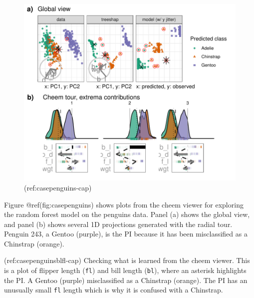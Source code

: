 \documentclass[
]{article}
\begin{document}
\begin{figure}

{\centering \includegraphics[width=1\linewidth]{./figures/case_penguins} 

}

\caption{(ref:casepenguins-cap)}\label{fig:casepenguins}
\end{figure}

Figure @ref(fig:casepenguins) shows plots from the cheem viewer for
exploring the random forest model on the penguins data. Panel (a) shows
the global view, and panel (b) shows several 1D projections generated
with the radial tour. Penguin 243, a Gentoo (purple), is the PI because
it has been misclassified as a Chinstrap (orange).

(ref:casepenguinsblfl-cap) Checking what is learned from the cheem
viewer. This is a plot of flipper length (\texttt{fl}) and bill length
(\texttt{bl}), where an asterisk highlights the PI. A Gentoo (purple)
misclassified as a Chinstrap (orange). The PI has an unusually small
\texttt{fl} length which is why it is confused with a Chinstrap.
\end{document}
